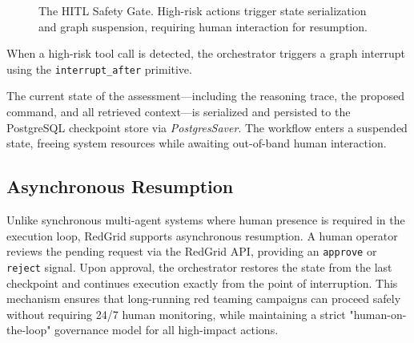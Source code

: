\documentclass[conference,compsoc]{IEEEtran}
\begin{document}
\begin{figure}[htbp]
\centering
{}
\caption{The HITL Safety Gate. High-risk actions trigger state serialization and graph suspension, requiring human interaction for resumption.}
\label{fig:hitl}
\end{figure}

When a high-risk tool call is detected, the orchestrator triggers a graph interrupt using the \texttt{interrupt\_after} primitive.

The current state of the assessment---including the reasoning trace, the proposed command, and all retrieved context---is serialized and persisted to the PostgreSQL checkpoint store via \textit{PostgresSaver}. The workflow enters a suspended state, freeing system resources while awaiting out-of-band human interaction.

\subsection{Asynchronous Resumption}
Unlike synchronous multi-agent systems where human presence is required in the execution loop, RedGrid supports asynchronous resumption. A human operator reviews the pending request via the RedGrid API, providing an \texttt{approve} or \texttt{reject} signal. Upon approval, the orchestrator restores the state from the last checkpoint and continues execution exactly from the point of interruption. This mechanism ensures that long-running red teaming campaigns can proceed safely without requiring 24/7 human monitoring, while maintaining a strict "human-on-the-loop" governance model for all high-impact actions.
\end{document}
